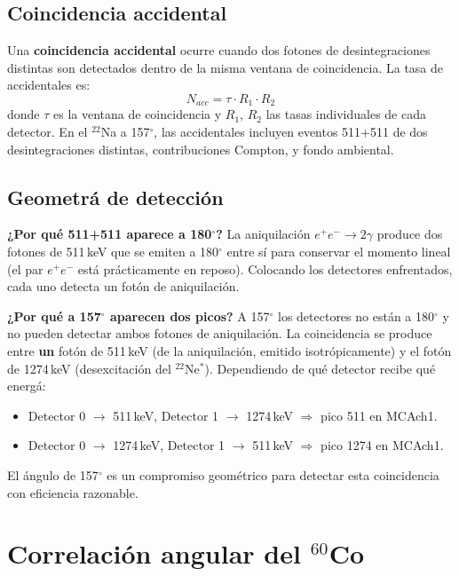 \documentclass[12pt,a4paper]{article}
\begin{document}
\subsection{Coincidencia accidental}

Una \textbf{coincidencia accidental} ocurre cuando dos fotones de desintegraciones distintas
son detectados dentro de la misma ventana de coincidencia. La tasa de accidentales es:
\begin{equation}
N_{acc} = \tau \cdot R_1 \cdot R_2
\end{equation}
donde $\tau$ es la ventana de coincidencia y $R_1$, $R_2$ las tasas individuales de cada detector.
En el $^{22}$Na a 157$^\circ$, las accidentales incluyen eventos 511+511 de dos desintegraciones
distintas, contribuciones Compton, y fondo ambiental.

\subsection{Geometr\'a de detecci\'on}

\textbf{¿Por qu\'e 511+511 aparece a 180$^\circ$?}
La aniquilaci\'on $e^+e^- \to 2\gamma$ produce dos fotones de 511\,keV que se emiten a
180$^\circ$ entre s\'i para conservar el momento lineal (el par $e^+e^-$ est\'a pr\'acticamente
en reposo). Colocando los detectores enfrentados, cada uno detecta un fot\'on de aniquilaci\'on.

\textbf{¿Por qu\'e a 157$^\circ$ aparecen dos picos?}
A 157$^\circ$ los detectores no est\'an a 180$^\circ$ y no pueden detectar ambos fotones de
aniquilaci\'on. La coincidencia se produce entre \textbf{un} fot\'on de 511\,keV
(de la aniquilaci\'on, emitido isotr\'opicamente) y el fot\'on de 1274\,keV
(desexcitaci\'on del $^{22}$Ne$^*$). Dependiendo de qu\'e detector recibe qu\'e energ\'a:
\begin{itemize}
  \item Detector 0 $\to$ 511\,keV, Detector 1 $\to$ 1274\,keV $\Rightarrow$ pico 511 en MCAch1.
  \item Detector 0 $\to$ 1274\,keV, Detector 1 $\to$ 511\,keV $\Rightarrow$ pico 1274 en MCAch1.
\end{itemize}
El \'angulo de 157$^\circ$ es un compromiso geom\'etrico para detectar esta coincidencia
con eficiencia razonable.

\section{Correlaci\'on angular del $^{60}$Co}
\end{document}
